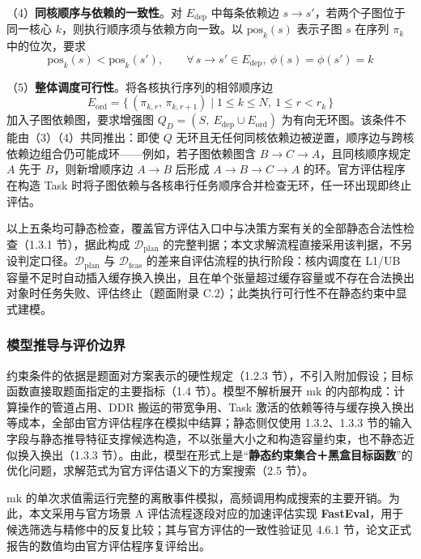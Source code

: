 （4）\textbf{同核顺序与依赖的一致性}。对 $E_{\mathrm{dep}}$ 中每条依赖边 $s\rightarrow s'$，若两个子图位于同一核心 $k$，则执行顺序须与依赖方向一致。以 $\mathrm{pos}_k(s)$ 表示子图 $s$ 在序列 $\pi_k$ 中的位次，要求
\begin{equation}
\mathrm{pos}_k(s) < \mathrm{pos}_k(s'),\qquad \forall\, s\rightarrow s'\in E_{\mathrm{dep}},\ \phi(s)=\phi(s')=k
\end{equation}

（5）\textbf{整体调度可行性}。将各核执行序列的相邻顺序边
\[
E_{\mathrm{ord}}=\{\,(\pi_{k,r},\,\pi_{k,r+1})\mid 1\le k\le N,\ 1\le r<r_k\,\}
\]
加入子图依赖图，要求增强图 $Q_D=(S,\ E_{\mathrm{dep}}\cup E_{\mathrm{ord}})$ 为有向无环图。该条件不能由（3）（4）共同推出：即使 $Q$ 无环且无任何同核依赖边被逆置，顺序边与跨核依赖边组合仍可能成环——例如，若子图依赖图含 $B\rightarrow C\rightarrow A$，且同核顺序规定 $A$ 先于 $B$，则新增顺序边 $A\rightarrow B$ 后形成 $A\rightarrow B\rightarrow C\rightarrow A$ 的环。官方评估程序在构造 Task 时将子图依赖与各核串行任务顺序合并检查无环，任一环出现即终止评估。

以上五条均可静态检查，覆盖官方评估入口中与决策方案有关的全部静态合法性检查（1.3.1 节），据此构成 $\mathcal{D}_{\mathrm{plan}}$ 的完整判据；本文求解流程直接采用该判据，不另设判定口径。$\mathcal{D}_{\mathrm{plan}}$ 与 $\mathcal{D}_{\mathrm{feas}}$ 的差来自评估流程的执行阶段：核内调度在 L1/UB 容量不足时自动插入缓存换入换出，且在单个张量超过缓存容量或不存在合法换出对象时任务失败、评估终止（题面附录 C.2）；此类执行可行性不在静态约束中显式建模。

\subsubsection{模型推导与评价边界}\label{sec:q1-evalbound}
约束条件的依据是题面对方案表示的硬性规定（1.2.3 节），不引入附加假设；目标函数直接取题面指定的主要指标（1.4 节）。模型不解析展开 $\mathrm{mk}$ 的内部构成：计算操作的管道占用、DDR 搬运的带宽争用、Task 激活的依赖等待与缓存换入换出等成本，全部由官方评估程序在模拟中结算；静态侧仅使用 1.3.2、1.3.3 节的输入字段与静态推导特征支撑候选构造，不以张量大小之和构造容量约束，也不静态近似换入换出（1.3.3 节）。由此，模型在形式上是“\textbf{静态约束集合＋黑盒目标函数}”的优化问题，求解范式为官方评估语义下的方案搜索（2.5 节）。

$\mathrm{mk}$ 的单次求值需运行完整的离散事件模拟，高频调用构成搜索的主要开销。为此，本文采用与官方场景 A 评估流程逐段对应的加速评估实现 \textbf{FastEval}，用于候选筛选与精修中的反复比较；其与官方评估的一致性验证见 4.6.1 节，论文正式报告的数值均由官方评估程序复评给出。

